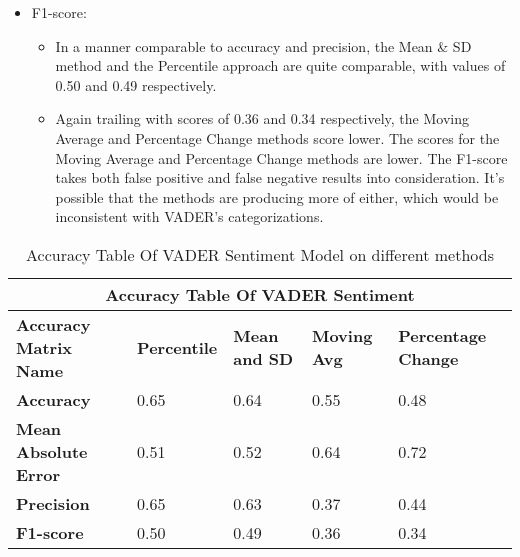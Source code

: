\documentclass[12pt, a4paper,twoside]{report}
\theoremstyle{plain} %
\theoremstyle{definition} %
\theoremstyle{remark} %
\numberwithin{equation}{chapter}
\begin{document}
\begin{itemize}
\begin{itemize}
            \end{itemize}
        \item F1-score:
            \begin{itemize}
                \item In a manner comparable to accuracy and precision, the Mean \& SD method and the Percentile approach are quite comparable, with values of 0.50 and 0.49 respectively.
                \item Again trailing with scores of 0.36 and 0.34 respectively, the Moving Average and Percentage Change methods score lower. The scores for the Moving Average and Percentage Change methods are lower. The F1-score takes both false positive and false negative results into consideration. It's possible that the methods are producing more of either, which would be inconsistent with VADER's categorizations.
            \end{itemize}
    \end{itemize}
    
    \begin{table}
        \begin{tabular}{ |p{3cm}||p{3cm}|p{3cm}|p{3cm}|p{3cm}| }
             \hline
             \multicolumn{5}{|c|}{Accuracy Table Of VADER Sentiment} \\
             \hline
             \textbf{Accuracy Matrix Name} & \textbf{Percentile} & \textbf{Mean and SD} & \textbf{Moving Avg} & \textbf{Percentage Change}\\
             \hline\hline
             \textbf{Accuracy}  & 0.65 & 0.64& 0.55& 0.48  \\
             \hline
             \textbf{Mean Absolute Error} & 0.51 & 0.52 & 0.64 & 0.72 \\
             \hline
             \textbf{Precision} & 0.65& 0.63& 0.37 & 0.44\\
             \hline
             \textbf{F1-score} & 0.50& 0.49 & 0.36& 0.34\\
             \hline
        \end{tabular}
        \caption{Accuracy Table Of VADER Sentiment Model on different methods}
    \label{tab:tweet_models_metrics}
    \end{table}
\end{document}
